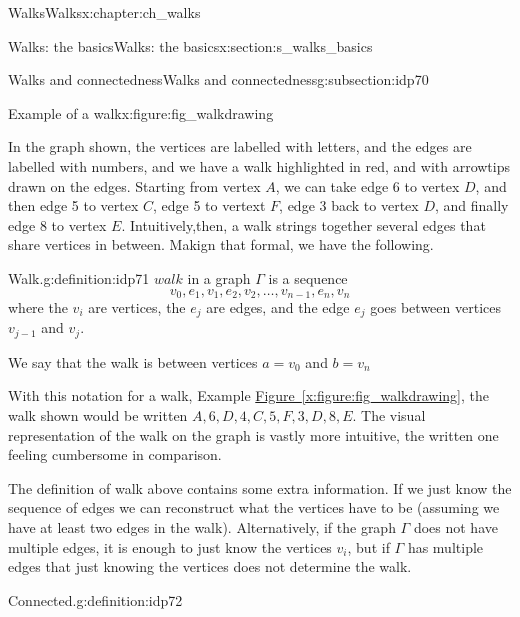 \documentclass[oneside,10pt,]{book}
\newcommand{\xreffont}{\relax}
\numberwithin{equation}{section}
\begin{document}
\begin{chapterptx}{Walks}{}{Walks}{}{}{x:chapter:ch_walks}
\begin{sectionptx}{Walks: the basics}{}{Walks: the basics}{}{}{x:section:s_walks_basics}
\begin{subsectionptx}{Walks and connectedness}{}{Walks and connectedness}{}{}{g:subsection:idp70}
\begin{figureptx}{Example of a walk}{x:figure:fig_walkdrawing}{}
\begin{image}{0.15}{0.7}{0.15}
{
}%
\end{image}%
\tcblower
\end{figureptx}%
In the graph shown, the vertices are labelled with letters, and the edges are labelled with numbers, and we have a walk highlighted in red, and with arrowtips drawn on the edges.  Starting from vertex \(A\), we can take edge 6 to vertex \(D\), and then edge 5 to vertex \(C\), edge 5 to vertext \(F\), edge 3 back to vertex \(D\), and finally edge 8 to vertex \(E\). Intuitively,then, a walk strings together several edges that share vertices in between.  Makign that formal, we have the following.%
\begin{definition}{Walk.}{g:definition:idp71}%
\(walk\) in a graph \(\Gamma\) is a sequence%
%
\begin{equation*}
v_0, e_1, v_1,e_2, v_2,\dots, v_{n-1}, e_n, v_n
\end{equation*}
where the \(v_i\) are vertices, the \(e_j\) are edges, and the edge \(e_j\) goes between vertices \(v_{j-1}\) and \(v_j\).%
\par
We say that the walk is between vertices \(a=v_0\) and \(b=v_n\)%
\end{definition}
With this notation for a walk, Example \hyperref[x:figure:fig_walkdrawing]{Figure~{\xreffont\ref{x:figure:fig_walkdrawing}}}, the walk shown would be written \(A, 6, D, 4, C, 5, F, 3, D, 8, E\).  The visual representation of the walk on the graph is vastly more intuitive, the written one feeling cumbersome in comparison.%
\par
The definition of walk above contains some extra information.  If we just know the sequence of edges we can reconstruct what the vertices have to be (assuming we have at least two edges in the walk).  Alternatively, if the graph \(\Gamma\) does not have multiple edges, it is enough to just know the vertices \(v_i\), but if \(\Gamma\) has multiple edges that just knowing the vertices does not determine the walk.%
\begin{definition}{Connected.}{g:definition:idp72}%

\end{definition}
\end{subsectionptx}
\end{sectionptx}
\end{chapterptx}
\end{document}

